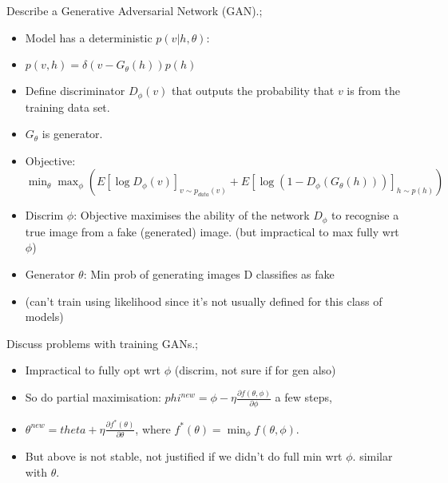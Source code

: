 \documentclass{article}
\begin{document}
Describe a Generative Adversarial Network (GAN).; \begin{itemize}
    \item Model has a deterministic $p(v|h, \theta)$: \item $p(v, h) = \delta(v-G_\theta(h))p(h)$
    \item Define discriminator $D_\phi(v)$ that outputs the probability that $v$ is from the training data set.
    \item $G_\theta$ is generator.
    \item Objective: $\min_\theta \max_\phi (E[\log D_\phi(v)]_{v\sim p_{data}(v)} + E[\log(1-D_{\phi}(G_\theta(h)))]_{h\sim p(h)})$ 
    \item Discrim $\phi$: Objective maximises the ability of the network $D_\phi$ to recognise a true image from a fake (generated) image. (but impractical to max fully wrt $\phi$)
    \item Generator $\theta$: Min prob of generating images D classifies as fake
    \item (can't train using likelihood since it's not usually defined for this class of models)
\end{itemize}

Discuss problems with training GANs.; \begin{itemize}
    \item Impractical to fully opt wrt $\phi$ (discrim, not sure if for gen also)
    \item So do partial maximisation: $phi^{new} = \phi - \eta \frac{\partial f(\theta, \phi)}{\partial \phi}$ a few steps, 
    \item $\theta^{new} = 
    theta + \eta \frac{\partial f^*(\theta)}{\partial \theta}$, where $f^*(\theta) = \min_{\phi} f(\theta, \phi)$. 
    \item But above is not stable, not justified if we didn't do full min wrt $\phi$.
    similar with $\theta$.
\end{itemize}
\end{document}
